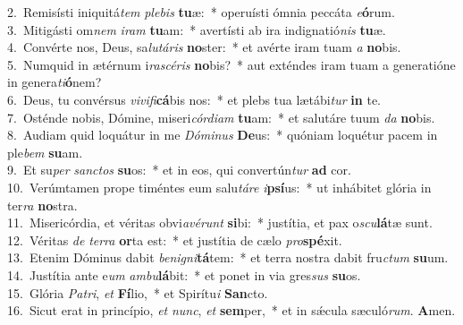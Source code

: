 {2.~}Remisísti iniquitá\textit{tem} \textit{ple}\textit{bis} \textbf{tu}æ:~* operuísti ómnia peccáta \textit{e}\textbf{ó}rum.\\
{3.~}Mitigásti om\textit{nem} \textit{i}\textit{ram} \textbf{tu}am:~* avertísti ab ira indignatió\textit{nis} \textbf{tu}æ.\\
{4.~}Convérte nos, Deus, sa\textit{lu}\textit{tá}\textit{ris} \textbf{no}ster:~* et avérte iram tuam \textit{a} \textbf{no}bis.\\
{5.~}Numquid in ætérnum i\textit{ra}\textit{scé}\textit{ris} \textbf{no}bis?~* aut exténdes iram tuam a generatióne in genera\textit{ti}\textbf{ó}nem?\\
{6.~}Deus, tu convérsus \textit{vi}\textit{vi}\textit{fi}\textbf{cá}bis nos:~* et plebs tua lætábi\textit{tur} \textbf{in} te.\\
{7.~}Osténde nobis, Dómine, miseri\textit{cór}\textit{di}\textit{am} \textbf{tu}am:~* et salutáre tuum \textit{da} \textbf{no}bis.\\
{8.~}Audiam quid loquátur in me \textit{Dó}\textit{mi}\textit{nus} \textbf{De}us:~* quóniam loquétur pacem in ple\textit{bem} \textbf{su}am.\\
{9.~}Et su\textit{per} \textit{san}\textit{ctos} \textbf{su}os:~* et in eos, qui convertún\textit{tur} \textbf{ad} cor.\\
{10.~}Verúmtamen prope timéntes eum salu\textit{tá}\textit{re} \textit{i}\textbf{psí}us:~* ut inhábitet glória in ter\textit{ra} \textbf{no}stra.\\
{11.~}Misericórdia, et véritas obvi\textit{a}\textit{vé}\textit{runt} \textbf{si}bi:~* justítia, et pax o\textit{scu}\textbf{lá}tæ sunt.\\
{12.~}Véritas \textit{de} \textit{ter}\textit{ra} \textbf{or}ta est:~* et justítia de cælo \textit{pro}\textbf{spé}xit.\\
{13.~}Etenim Dóminus dabit \textit{be}\textit{ni}\textit{gni}\textbf{tá}tem:~* et terra nostra dabit fru\textit{ctum} \textbf{su}um.\\
{14.~}Justítia ante e\textit{um} \textit{am}\textit{bu}\textbf{lá}bit:~* et ponet in via gres\textit{sus} \textbf{su}os.\\
{15.~}Glória \textit{Pa}\textit{tri}, \textit{et} \textbf{Fí}lio,~* et Spirítu\textit{i} \textbf{San}cto.\\
{16.~}Sicut erat in princípio, \textit{et} \textit{nunc}, \textit{et} \textbf{sem}per,~* et in sǽcula sæculó\textit{rum}. \textbf{A}men.\\
